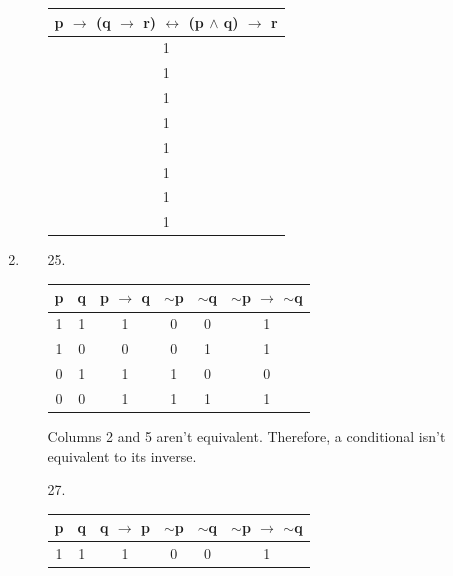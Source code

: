 \documentclass[12pt]{article}
\begin{document}
\begin{enumerate}[label = \alph*)]
\begin{itemize}
\begin{center}
\begin{tabular}{c}
                        p $\rightarrow$ (q $\rightarrow$ r) $\leftrightarrow$
                                         (p $\wedge$ q) $\rightarrow$ r \\
                        \hline
                        1 \\
                        1 \\
                        1 \\
                        1 \\
                        1 \\
                        1 \\
                        1 \\
                        1 \\
                    \end{tabular}
                \end{center}
        \end{itemize}
    \item
        \begin{itemize}
            \item [25.]
                \vspace{4.5em}
                \begin{tabular}{cc|c|c|c|c}
                    p & q & p $\rightarrow$ q & $\sim$p & $\sim$q &
                            $\sim$p $\rightarrow$ $\sim$q\\
                    \hline
                    1 & 1 & 1 & 0 & 0 & 1 \\
                    1 & 0 & 0 & 0 & 1 & 1 \\
                    0 & 1 & 1 & 1 & 0 & 0 \\
                    0 & 0 & 1 & 1 & 1 & 1 \\
                \end{tabular}
            \item []
                \vspace{1em}
                Columns 2 and 5 aren't equivalent. Therefore, a conditional isn't
                equivalent to its inverse.
            \item [27.]
                \vspace{2em}
                \begin{tabular}{cc|c|c|c|c}
                    p & q & q $\rightarrow$ p & $\sim$p & $\sim$q &
                            $\sim$p $\rightarrow$ $\sim$q\\
                    \hline
                    1 & 1 & 1 & 0 & 0 & 1 \\

\end{tabular}
\end{itemize}
\end{enumerate}
\end{document}
